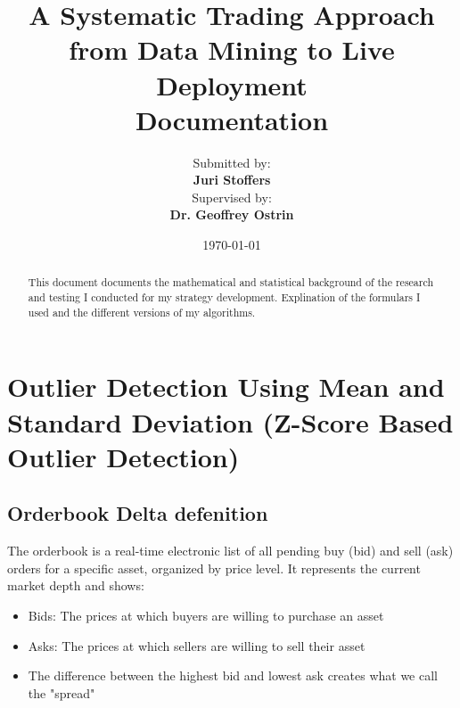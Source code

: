 \documentclass[12pt]{article}
\title{
    \Huge\textbf{A Systematic Trading Approach from Data Mining to Live Deployment}\\
    \vspace{1cm}
    \Large Documentation\\
    \vspace{2cm}
}
\author{
    \Large Submitted by:\\
    \vspace{0.5cm}
    \textbf{Juri Stoffers}\\
    \vspace{2cm}
    \Large Supervised by:\\
    \vspace{0.5cm}
    \textbf{Dr. Geoffrey Ostrin}\\
    \vspace{2cm}
}
\date{\Large \today}
\begin{document}
\begin{titlepage}
\maketitle
\thispagestyle{empty}
\end{titlepage}

\newpage
\null
\thispagestyle{empty}



\begin{center}
\begin{abstract}
  This document documents the mathematical and statistical background of the research and testing I conducted for my strategy development. Explination of the formulars I used and the different versions of my algorithms.
\end{abstract}
\end{center}




\newpage





\tableofcontents
\newpage









\newpage


\section{Outlier Detection Using Mean and Standard Deviation (Z-Score Based Outlier Detection)}\label{sec:outlier_detection}


\subsection{Orderbook Delta defenition}
The orderbook is a real-time electronic list of all pending buy (bid) and sell (ask) orders for a specific asset, organized by price level. It represents the current market depth and shows:

\begin{itemize}
  \item Bids: The prices at which buyers are willing to purchase an asset 
  \item Asks: The prices at which sellers are willing to sell their asset
  \item The difference between the highest bid and lowest ask creates what we call the "spread"
\end{itemize}
\end{document}
